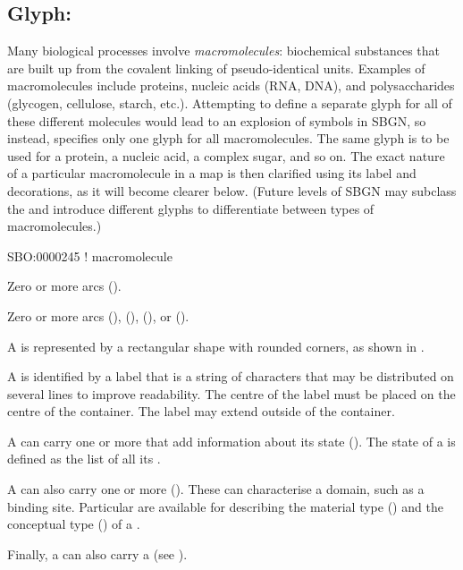\subsection{Glyph: }
\label{sec:macromolecule}

Many biological processes involve \emph{macromolecules}: biochemical substances that are built up from the covalent linking of pseudo-identical units.
Examples of macromolecules include proteins, nucleic acids (RNA, DNA), and polysaccharides (glycogen, cellulose, starch, etc.).
Attempting to define a separate glyph for all of these different molecules would lead to an explosion of symbols in SBGN, so instead, \SBGNPDLone specifies only one glyph for all macromolecules.
The same glyph is to be used for a protein, a nucleic acid, a complex sugar, and so on.
The exact nature of a particular macromolecule in a map is then clarified using its label and decorations, as it will become clearer below.
% 
(Future levels of SBGN may subclass the  and introduce different glyphs to differentiate between types of macromolecules.)

\begin{glyphDescription}

\glyphSboTerm
SBO:0000245 ! macromolecule

\glyphIncoming
Zero or more  arcs ().

\glyphOutgoing
Zero or more  arcs (),  (),  (), or  ().

\glyphContainer
A  is represented by a rectangular shape with rounded corners, as shown in .

\glyphLabel
A  is identified by a label  that is a string of characters that may be distributed on several lines to improve readability.
The centre of the label must be placed on the centre of the container.
The label may extend outside of the container.

\glyphAux
A  can carry one or more  that add information about its state ().
The state of a  is defined as the list of all its .

A  can also carry one or more  ().
These can characterise a domain, such as a binding site.
Particular  are available for describing the material type () and the conceptual type () of a .

Finally, a  can also carry a  (see ).

\end{glyphDescription}

